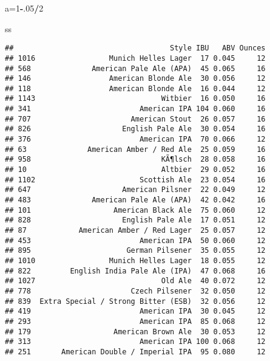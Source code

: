 \documentclass[]{article}
\newenvironment{Shaded}{\begin{snugshade}}{\end{snugshade}}
\newcommand{\KeywordTok}[1]{\textcolor[rgb]{0.13,0.29,0.53}{\textbf{#1}}}
\newcommand{\DataTypeTok}[1]{\textcolor[rgb]{0.13,0.29,0.53}{#1}}
\newcommand{\DecValTok}[1]{\textcolor[rgb]{0.00,0.00,0.81}{#1}}
\newcommand{\StringTok}[1]{\textcolor[rgb]{0.31,0.60,0.02}{#1}}
\newcommand{\CommentTok}[1]{\textcolor[rgb]{0.56,0.35,0.01}{\textit{#1}}}
\newcommand{\OperatorTok}[1]{\textcolor[rgb]{0.81,0.36,0.00}{\textbf{#1}}}
\newcommand{\NormalTok}[1]{#1}
\begin{document}
\begin{Shaded}
\begin{Highlighting}[]
\NormalTok{a=}\DecValTok{1}\OperatorTok{-}\NormalTok{.}\DecValTok{05}\OperatorTok{/}\DecValTok{2}


\NormalTok{ss}
\end{Highlighting}
\end{Shaded}

\begin{verbatim}
##                                    Style IBU   ABV Ounces
## 1016                 Munich Helles Lager  17 0.045     12
## 568              American Pale Ale (APA)  45 0.065     16
## 146                  American Blonde Ale  30 0.056     12
## 118                  American Blonde Ale  16 0.044     12
## 1143                             Witbier  16 0.050     16
## 341                         American IPA 104 0.060     16
## 707                       American Stout  26 0.057     16
## 826                     English Pale Ale  30 0.054     16
## 376                         American IPA  70 0.066     12
## 63              American Amber / Red Ale  25 0.059     16
## 958                              KÃ¶lsch  28 0.058     16
## 10                               Altbier  29 0.052     16
## 1102                        Scottish Ale  23 0.054     16
## 647                     American Pilsner  22 0.049     12
## 483              American Pale Ale (APA)  42 0.042     16
## 101                   American Black Ale  75 0.060     12
## 828                     English Pale Ale  17 0.051     12
## 87            American Amber / Red Lager  25 0.057     12
## 453                         American IPA  50 0.060     12
## 895                      German Pilsener  35 0.055     12
## 1010                 Munich Helles Lager  18 0.055     12
## 822         English India Pale Ale (IPA)  47 0.068     16
## 1027                             Old Ale  40 0.072     12
## 778                       Czech Pilsener  32 0.050     12
## 839  Extra Special / Strong Bitter (ESB)  32 0.056     12
## 419                         American IPA  30 0.045     12
## 293                         American IPA  85 0.068     12
## 179                   American Brown Ale  30 0.053     12
## 313                         American IPA 100 0.068     12
## 251       American Double / Imperial IPA  95 0.080     12
\end{verbatim}

\begin{Shaded}
\end{Shaded}
\end{document}
